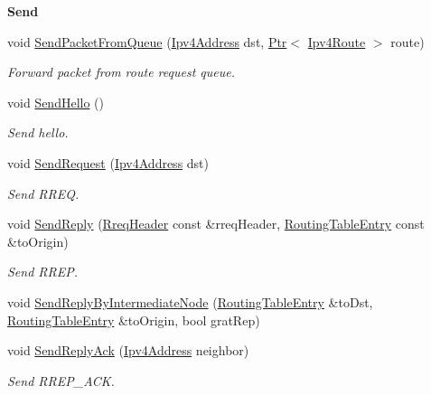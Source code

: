 \begin{Indent}{\bf Send}\par
\begin{DoxyCompactItemize}
\item 
void \hyperlink{classns3_1_1aodv_1_1RoutingProtocol_a7cd2a3baf7b377fbbf85de4275164f2b}{Send\+Packet\+From\+Queue} (\hyperlink{classns3_1_1Ipv4Address}{Ipv4\+Address} dst, \hyperlink{classns3_1_1Ptr}{Ptr}$<$ \hyperlink{classns3_1_1Ipv4Route}{Ipv4\+Route} $>$ route)
\begin{DoxyCompactList}\small\item\em Forward packet from route request queue. \end{DoxyCompactList}\item 
void \hyperlink{classns3_1_1aodv_1_1RoutingProtocol_a1b772ee4eda1d3dae376dac6926c0dcf}{Send\+Hello} ()
\begin{DoxyCompactList}\small\item\em Send hello. \end{DoxyCompactList}\item 
void \hyperlink{classns3_1_1aodv_1_1RoutingProtocol_a483f8df4d7855b2a71e506f665ca0828}{Send\+Request} (\hyperlink{classns3_1_1Ipv4Address}{Ipv4\+Address} dst)
\begin{DoxyCompactList}\small\item\em Send R\+R\+EQ. \end{DoxyCompactList}\item 
void \hyperlink{classns3_1_1aodv_1_1RoutingProtocol_a39c60e597085c4abc690e6215d302a1f}{Send\+Reply} (\hyperlink{classns3_1_1aodv_1_1RreqHeader}{Rreq\+Header} const \&rreq\+Header, \hyperlink{classns3_1_1aodv_1_1RoutingTableEntry}{Routing\+Table\+Entry} const \&to\+Origin)
\begin{DoxyCompactList}\small\item\em Send R\+R\+EP. \end{DoxyCompactList}\item 
void \hyperlink{classns3_1_1aodv_1_1RoutingProtocol_a862f551b61c45fb8de62bfbfa4c0a2ab}{Send\+Reply\+By\+Intermediate\+Node} (\hyperlink{classns3_1_1aodv_1_1RoutingTableEntry}{Routing\+Table\+Entry} \&to\+Dst, \hyperlink{classns3_1_1aodv_1_1RoutingTableEntry}{Routing\+Table\+Entry} \&to\+Origin, bool grat\+Rep)
\item 
void \hyperlink{classns3_1_1aodv_1_1RoutingProtocol_aec193d679517de0a34d2e9d592b7bc77}{Send\+Reply\+Ack} (\hyperlink{classns3_1_1Ipv4Address}{Ipv4\+Address} neighbor)
\begin{DoxyCompactList}\small\item\em Send R\+R\+E\+P\+\_\+\+A\+CK. \end{DoxyCompactList}\item 

\end{DoxyCompactItemize}
\end{Indent}

